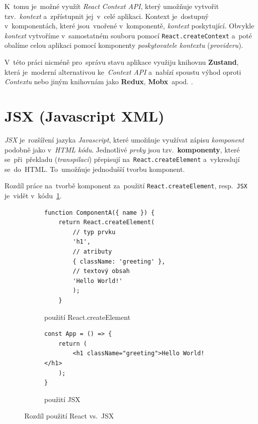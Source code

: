 \documentclass[11pt,a4paper]{report}
\begin{document}
            K~tomu je~možné využít \emph{React Context API}, který umožňuje vytvořit tzv.~\emph{kontext} a~zpřístupnit jej~v~celé aplikaci. Kontext je~dostupný v~komponentách, které jsou~vnořené v~komponentě, \emph{kontext} poskytující. Obvykle \emph{kontext} vytvoříme v~samostatném souboru pomocí \texttt{React.createContext} a~poté obalíme celou aplikaci pomocí komponenty \emph{poskytovatele kontextu} (\emph{provideru}).
            
            V~této práci nicméně pro~správu stavu aplikace využiju knihovnu \textbf{Zustand}, která je~moderní alternativou ke~\emph{Context API} a~nabízí spoustu výhod oproti \emph{Contextu} nebo jiným knihovnám jako \textbf{Redux}, \textbf{Mobx}~apod. \cite{openreplayReactState}.

        \section{JSX (Javascript XML)}
            \emph{JSX} je~rozšíření jazyka \emph{Javascript}, které umožňuje využívat zápisu \emph{komponent} podobně jako v~\emph{HTML kódu}. Jednotlivé \emph{prvky} jsou tzv.~\textbf{komponenty}, které se~při~překladu (\emph{transpilaci}) přepisují na~\texttt{React.createElement} a~vykreslují se~do~HTML. To~umožňuje jednodušší tvorbu komponent. \cite{reactJSX}
            
            Rozdíl práce na~tvorbě komponent za~použití \texttt{React.createElement}, resp.~\texttt{JSX} je~vidět v~kódu~\ref{JSXcomponent}.
            \begin{figure}
                \begin{subfigure}[b]{0.45\linewidth}
                    \begin{verbatim}
function ComponentA({ name }) {
    return React.createElement(
        // typ prvku
        'h1',
        // atributy
        { className: 'greeting' },
        // textový obsah
        'Hello World!'
        );
    }
                    \end{verbatim}
                \caption{použití React.createElement}
                \end{subfigure}
                \hfill
                \begin{subfigure}[b]{0.45\linewidth}
                    \begin{verbatim}
const App = () => {
    return (
        <h1 className="greeting">Hello World!</h1>
    );
}
                    \end{verbatim}
                    \vspace{1cm}
                    \caption{použití JSX}
                \end{subfigure}
                \caption{Rozdíl použití React vs.~JSX}
                \label{JSXcomponent}
            \end{figure}
\end{document}
